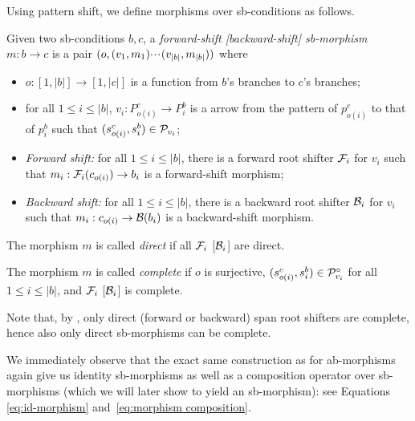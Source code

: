 Using pattern shift, we define morphisms over sb-conditions as follows.
%
\begin{definition}
  Given two sb-conditions $b,c$, a \emph{forward-shift [backward-shift] sb-morphism} $m:b\to c$ is a pair $(o,(v_1,m_1){\cdotp\mkern-2mu\cdotp\mkern-2mu\cdotp\mkern1mu} (v_{|b|},m_{|b|}))$ where
  \begin{itemize}[topsep=\smallskipamount]
  \item $o:[1,|b|]\to [1,|c|]$ is a function from $b$'s branches to $c$'s branches;
  \item for all $1\leq i\leq |b|$, $v_i:P^c_{o(i)}\to P^b_i$ is a arrow from the pattern of $p^c_{o(i)}$ to that of $p^b_i$ such that $(s^c_{o(i)},s^b_i)\in \mathcal{P}_{v_i}$;
  \item \emph{Forward shift:} for all $1\leq i\leq |b|$, there is a forward root shifter $\mathcal{F}_i$ for $v_i$ such that $m_i:\mathcal{F}_i(c_{o(i)})\to b_i$ is a forward-shift morphism;
  \item \emph{Backward shift:} for all $1\leq i\leq |b|$, there is a backward root shifter $\mathcal{B}_i$ for $v_i$ such that $m_i:c_{o(i)}\to \mathcal{B}(b_i)$ is a backward-shift morphism.
  \end{itemize}
  The morphism $m$ is called \emph{direct} if all $\mathcal{F}_i$ [$\mathcal{B}_i$] are direct.
  
  The morphism $m$ is called \emph{complete} if $o$ is surjective, $(s^c_{o(i)},s^b_i)\in \mathcal{P}^\circ_{v_i}$ for all $1\leq i\leq |b|$, and $\mathcal{F}_i$ [$\mathcal{B}_i$] is complete.
\end{definition}
%
Note that, by , only direct (forward or backward) span root shifters are complete, hence also only direct sb-morphisms can be complete.

%
We immediately observe that the exact same construction as for ab-morphisms again give us identity sb-morphisms as well as a composition operator over sb-morphisms (which we will later show to yield an sb-morphism): see Equations \eqref{eq:id-morphism} and~\eqref{eq:morphism composition}.

